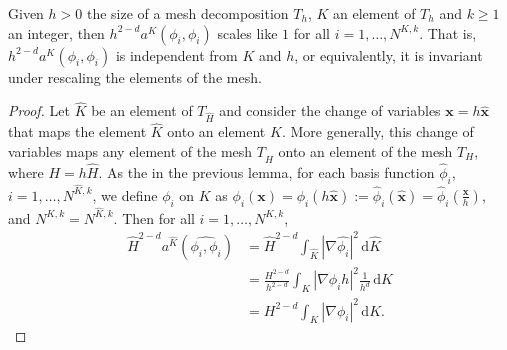 \begin{lemma} \label{lemma2}
Given $h>0$ the size of a mesh decomposition $T_h$, $K$ an element of $T_h$ and $k\geq 1$ an integer, then $h^{2-d}a^K(\phi_i,\phi_i)$ scales like $1$ for all $i=1,\ldots,N^{K,k}$. That is, $h^{2-d}a^K(\phi_i,\phi_i)$ is independent from $K$ and $h$, or equivalently, it is invariant under rescaling the elements of the mesh. 
\end{lemma}
\begin{proof}
Let $\hat{K}$ be an element of $T_{\hat{H}}$ and consider the change of variables $\mathbf{x}=h\hat{\mathbf{x}}$ that maps the element $\hat{K}$ onto an element $K$. More generally, this change of variables maps any element of the mesh $T_{\hat{H}}$ onto an element of the mesh $T_H$, where $H=h\hat{H}$. As the in the previous lemma, for each basis function $\hat{\phi}_i$, $i=1,\ldots,N^{\hat{K},k}$, we define $\phi_i$ on $K$ as $\phi_i(\mathbf{x}) = \phi_i(h\mathbf{\hat{x}}) := \hat{\phi}_i(\hat{\mathbf{x}}) = \hat{\phi}_i\left(\frac{\mathbf{x}}{h}\right)$, and $N^{K,k}=N^{\hat{K},k}$. Then for all $i=1,\ldots,N^{K,k}$, 
\begin{align*}
\hat{H}^{2-d}a^{\hat{K}}(\hat{\phi_i,\phi_i}) &= \hat{H}^{2-d}\int_{\hat{K}} |\nabla \hat{\phi_i}|^2 \, \mathrm{d}\hat{K} \\
&= \frac{H^{2-d}}{h^{2-d}} \int_K |\nabla \phi_i h|^2 \frac{1}{h^d} \, \mathrm{d}K\\
&= H^{2-d} \int_K |\nabla \phi_i|^2 \, \mathrm{d}K.
\end{align*}
\end{proof}

